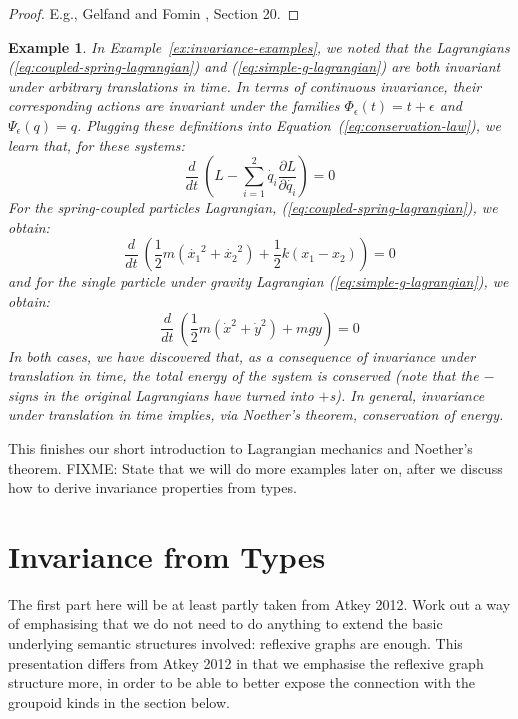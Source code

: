 \documentclass[preprint]{sigplanconf}
\theoremstyle{examplestyle}
\newtheorem{example}{Example}
\begin{document}
\begin{proof}
  E.g., Gelfand and Fomin \cite{gelfandXXcalculus}, Section 20.
\end{proof}

\begin{example}
  In Example~\ref{ex:invariance-examples}, we noted that the
  Lagrangians (\ref{eq:coupled-spring-lagrangian}) and
  (\ref{eq:simple-g-lagrangian}) are both invariant under arbitrary
  translations in time. In terms of continuous invariance, their
  corresponding actions are invariant under the families
  $\Phi_\epsilon(t) = t + \epsilon$ and $\Psi_\epsilon(q) =
  q$. Plugging these definitions into
  Equation~(\ref{eq:conservation-law}), we learn that, for these
  systems:
  \begin{displaymath}
    \frac{d}{dt}~\left(L - \sum_{i=1}^2 \dot{q_i}\frac{\partial L}{\partial \dot{q_i}} \right) = 0
  \end{displaymath}
  For the spring-coupled particles Lagrangian,
  (\ref{eq:coupled-spring-lagrangian}), we obtain:
  \begin{displaymath}
    \frac{d}{dt}~\left(\frac{1}{2}m(\dot{x_1}^2 + \dot{x_2}^2) + \frac{1}{2}k(x_1 - x_2) \right) = 0
  \end{displaymath}
  and for the single particle under gravity Lagrangian
  (\ref{eq:simple-g-lagrangian}), we obtain:
  \begin{displaymath}
    \frac{d}{dt}~\left(\frac{1}{2}m(\dot{x}^2 + \dot{y}^2) + mgy\right) = 0
  \end{displaymath}
  In both cases, we have discovered that, as a consequence of
  invariance under translation in time, the total energy of the system
  is conserved (note that the $-$ signs in the original Lagrangians
  have turned into $+$s). In general, invariance under translation in
  time implies, via Noether's theorem, conservation of energy.
\end{example}

This finishes our short introduction to Lagrangian mechanics and
Noether's theorem. FIXME: State that we will do more examples later
on, after we discuss how to derive invariance properties from types.

\section{Invariance from Types}
\label{sec:symmetry-from-types}

The first part here will be at least partly taken from Atkey
2012. Work out a way of emphasising that we do not need to do anything
to extend the basic underlying semantic structures involved: reflexive
graphs are enough. This presentation differs from Atkey 2012 in that
we emphasise the reflexive graph structure more, in order to be able
to better expose the connection with the groupoid kinds in the section
below.
\end{document}
